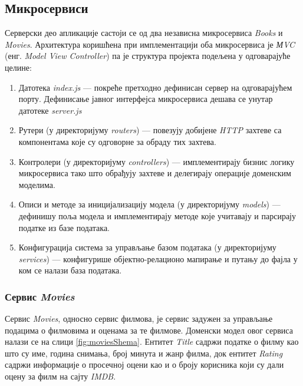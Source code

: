 \documentclass[12pt,oneside]{memoir}
\begin{document}
\subsection{Микросервиси}

Серверски део апликације састоји се од два независна микросервиса \textit{Books} и \textit{Movies}. Архитектура коришћена при имплементацији оба микросервиса је \textit{МVC} (енг. \textit{Model View Controller}) па је структура пројекта подељена у одговарајуће целине:
\begin{enumerate}
\item Датотека \textit{index.js} --- покреће претходно дефинисан сервер на одговарајућем порту. Дефинисање јавног интерфејса микросервиса дешава се унутар датотеке \textit{server.js}
\item Рутери (у директоријуму \textit{routers}) --- повезују добијене \textit{HTTP} захтеве са компонентама које су одговорне за обраду тих захтева.
\item Контролери (у директоријуму \textit{controllers}) --- имплементирају бизнис логику микросервиса тако што обрађују захтеве и делегирају операције доменским моделима.
\item Описи и методе за иницијализацију модела (у директоријуму \textit{models}) ---  дефинишу поља модела и имплементирају методе које учитавају и парсирају податке из базе података.
\item Конфигурација  система за управљање базом података (у директоријуму \textit{services}) --- конфигурише објектно-релационо мапирање и путању до фајла у ком се налази база података.
\end{enumerate}


\newpage
\subsubsection{Сервис \textit{Movies}}

Сервис \textit{Movies}, односно сервис филмова, је сервис задужен за управљање подацима о филмовима и оценама за те филмове. Доменски модел овог сервиса налази се на слици \ref{fig:moviesShema}. Ентитет \textit{Title} садржи податке о филму као што су име, година снимања, број минута и жанр филма, док ентитет \textit{Rating} садржи информације о просечној оцени као и о броју корисника који су дали оцену за филм на сајту \textit{IMDB}.
\end{document}

